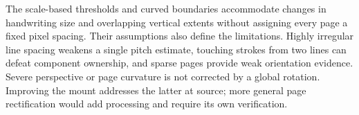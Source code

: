 The scale-based thresholds and curved boundaries accommodate changes in handwriting size and overlapping vertical extents without assigning every page a fixed pixel spacing. Their assumptions also define the limitations. Highly irregular line spacing weakens a single pitch estimate, touching strokes from two lines can defeat component ownership, and sparse pages provide weak orientation evidence. Severe perspective or page curvature is not corrected by a global rotation. Improving the mount addresses the latter at source; more general page rectification would add processing and require its own verification.
\FloatBarrier
